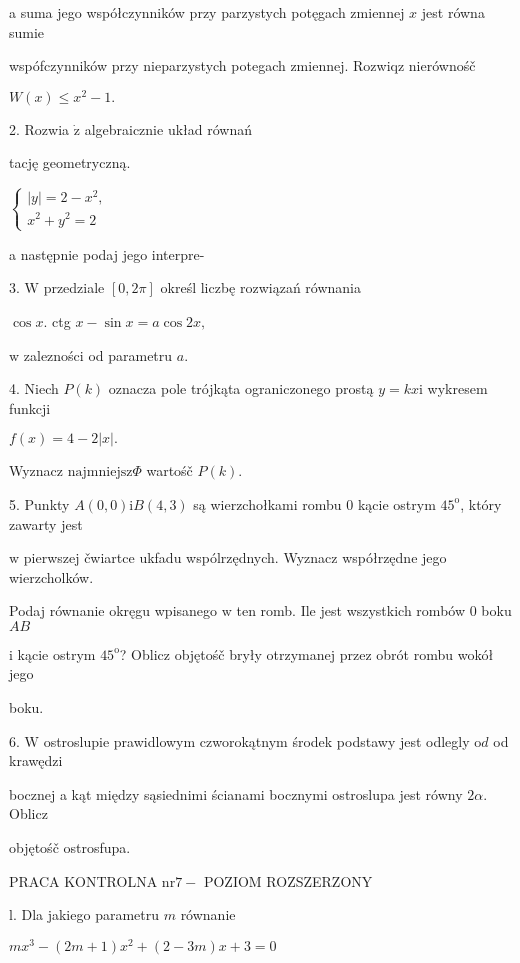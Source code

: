 \documentclass[a4paper,12pt]{article}
\begin{document}
a suma jego współczynników przy parzystych potęgach zmiennej $x$ jest równa sumie

wspófczynników przy nieparzystych potegach zmiennej. Rozwiqz nierównośč

$W(x)\leq x^{2}-1.$

2. Rozwia $\dot{\mathrm{z}}$ algebraicznie układ równań

tację geometryczną.

$\left\{\begin{array}{l}
|y|=2-x^{2},\\
x^{2}+y^{2}=2
\end{array}\right.$

a następnie podaj jego interpre-

3. $\mathrm{W}$ przedziale $[0,2\pi]$ określ liczbę rozwiązań równania

$\cos x$. ctg $x-\sin x=a\cos 2x,$

$\mathrm{w}$ zalezności od parametru $a.$

4. Niech $P(k)$ oznacza pole trójkąta ograniczonego prostą $y=kx\mathrm{i}$ wykresem funkcji

$f(x)=4-2|x|.$

Wyznacz $\mathrm{n}\mathrm{a}\mathrm{j}\mathrm{m}\mathrm{n}\mathrm{i}\mathrm{e}\mathrm{j}\mathrm{s}\mathrm{z}\Phi$ wartośč $P(k).$

5. Punkty $A(0,0)\mathrm{i}B(4,3)$ są wierzchołkami rombu $0$ kącie ostrym $45^{\mathrm{o}}$, który zawarty jest

$\mathrm{w}$ pierwszej čwiartce ukfadu wspólrzędnych. Wyznacz współrzędne jego wierzcholków.

Podaj równanie okręgu wpisanego $\mathrm{w}$ ten romb. Ile jest wszystkich rombów $0$ boku $AB$

$\mathrm{i}$ kącie ostrym $45^{\mathrm{o}}$? Oblicz objętośč bryły otrzymanej przez obrót rombu wokół jego

boku.

6. $\mathrm{W}$ ostroslupie prawidlowym czworokątnym środek podstawy jest odlegly $\mathrm{o}d$ od krawędzi

bocznej a kąt między sąsiednimi ścianami bocznymi ostroslupa jest równy $ 2\alpha$. Oblicz

objętośč ostrosfupa.




PRACA KONTROLNA $\mathrm{n}\mathrm{r} 7-$ POZIOM ROZSZERZONY

l. Dla jakiego parametru $m$ równanie

$mx^{3}-(2m+1)x^{2}+(2-3m)x+3=0$
\end{document}
